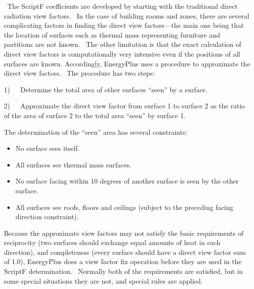 ~The ScriptF coefficients are developed by starting with the traditional direct radiation view factors.~ In the case of building rooms and zones, there are several complicating factors in finding the direct view factors---the main one being that the location of surfaces such as thermal mass representing furniture and partitions are not known.~ The other limitation is that the exact calculation of direct view factors is computationally very intensive even if the positions of all surfaces are known. Accordingly, EnergyPlus uses a procedure to approximate the direct view factors.~ The procedure has two steps:

1)~~~Determine the total area of other surfaces ``seen'' by a surface.

2)~~~Approximate the direct view factor from surface 1 to surface 2 as the ratio of the area of surface 2 to the total area ``seen'' by surface 1.

The determination of the ``seen'' area has several constraints:

\begin{itemize}
\item
  No surface sees itself.
\item
  All surfaces see thermal mass surfaces.
\item
  No surface facing within 10 degrees of another surface is seen by the other surface.
\item
  All surfaces see roofs, floors and ceilings (subject to the preceding facing direction constraint).
\end{itemize}

Because the approximate view factors may not satisfy the basic requirements of reciprocity (two surfaces should exchange equal amounts of heat in each direction), and completeness (every surface should have a direct view factor sum of 1.0), EnergyPlus does a view factor fix operation before they are used in the ScriptF determination.~ Normally both of the requirements are satisfied, but in some special situations they are not, and special rules are applied.


